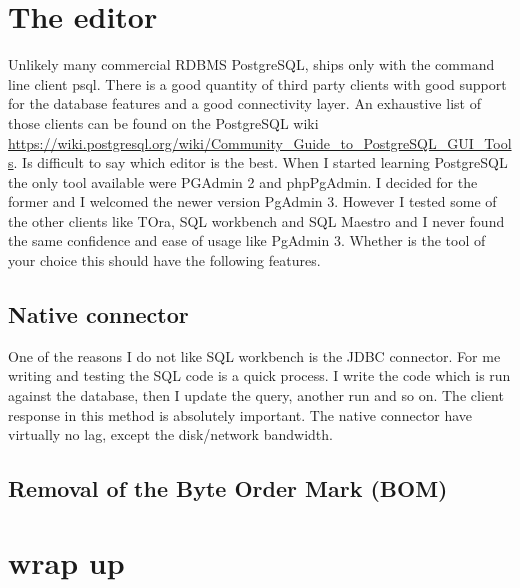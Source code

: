 \section{The editor}
Unlikely many commercial RDBMS PostgreSQL, ships only with the command line client psql. There is a 
good quantity of third party clients with good support for the database features and a good connectivity 
layer. An exhaustive list of those clients can be found on the PostgreSQL wiki\newline
\href{https://wiki.postgresql.org/wiki/Community\_Guide\_to\_PostgreSQL\_GUI\_Tools}{
https://wiki.postgresql.org/wiki/Community\_Guide\_to\_PostgreSQL\_GUI\_Tools}. Is difficult to say 
which editor is the best. When I started learning PostgreSQL the only tool available were PGAdmin 2 and 
phpPgAdmin. I decided for the former and I welcomed the newer version PgAdmin 3. However I tested some of 
the other clients like TOra, SQL workbench and SQL Maestro and I never found the same confidence and ease 
of usage like PgAdmin 3. Whether is the tool of your choice this should have the following features.

\subsection{Native connector}
One of the reasons I do not like SQL workbench is the JDBC connector. For me writing and testing the SQL 
code is a quick process. I write the code which is run against the database, then I update the query, 
another run and so on. The client response in this method is absolutely important. The native connector 
have virtually no lag, except the disk/network bandwidth.

\subsection{Removal of the Byte Order Mark (BOM)} 


\section{wrap up}
